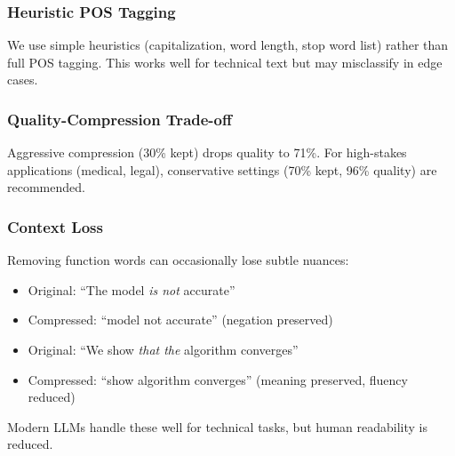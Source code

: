 \subsubsection{Heuristic POS Tagging}

We use simple heuristics (capitalization, word length, stop word list) rather than full POS tagging. This works well for technical text but may misclassify in edge cases.

\subsubsection{Quality-Compression Trade-off}

Aggressive compression (30\% kept) drops quality to 71\%. For high-stakes applications (medical, legal), conservative settings (70\% kept, 96\% quality) are recommended.

\subsubsection{Context Loss}

Removing function words can occasionally lose subtle nuances:
\begin{itemize}
    \item Original: ``The model \textit{is not} accurate''
    \item Compressed: ``model not accurate'' (negation preserved)
    \item Original: ``We show \textit{that the} algorithm converges''
    \item Compressed: ``show algorithm converges'' (meaning preserved, fluency reduced)
\end{itemize}

Modern LLMs handle these well for technical tasks, but human readability is reduced.
